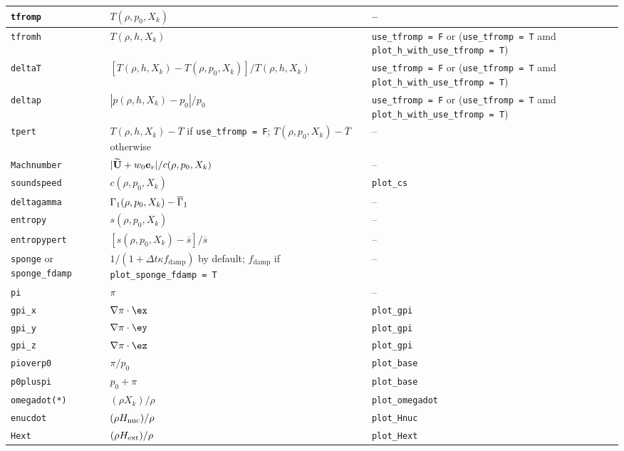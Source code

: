 \begin{center}
\begin{longtable}{|l|p{2.25in}|p{2.5in}|}
\hline
{\tt tfromp}              & $T(\rho, p_0, X_k)$  & -- \\
\hline
{\tt tfromh}            & $T(\rho, h, X_k)$    & {\tt use\_tfromp = F} or ({\tt use\_tfromp = T} amd {\tt plot\_h\_with\_use\_tfromp = T}) \\           
\hline
{\tt deltaT}            & $[T(\rho, h, X_k) - T(\rho, p_0, X_k)]/T(\rho, h, X_k)$  & {\tt use\_tfromp = F} or ({\tt use\_tfromp = T} amd {\tt plot\_h\_with\_use\_tfromp = T}) \\           
\hline
{\tt deltap}            & $|p(\rho,h,X_k) - p_0|/p_0$ & {\tt use\_tfromp = F} or ({\tt use\_tfromp = T} amd {\tt plot\_h\_with\_use\_tfromp = T}) \\           
\hline
{\tt tpert}               & $T(\rho,h,X_k) - \overline{T}$ if {\tt use\_tfromp = F}; $T(\rho,p_0,X_k) - \overline{T}$ otherwise & -- \\
\hline
{\tt Machnumber}          & $| \widetilde{{\bf U}} + w_0 \mathbf{e}_r | / c(\rho,p_0,X_k)$ & -- \\
\hline
{\tt soundspeed}        & $c(\rho,p_0,X_k)$ & {\tt plot\_cs} \\
\hline
{\tt deltagamma}          & $\Gamma_1(\rho,p_0,X_k) - \overline{\Gamma}_1$ & -- \\
\hline
{\tt entropy}             & $s(\rho,p_0,X_k)$ & -- \\
\hline
{\tt entropypert}         & $[s(\rho,p_0,X_k) - \overline{s}]/\overline{s}$ & -- \\
\hline
{\tt sponge} or {\tt sponge\_fdamp} & $1/(1 + \Delta t \kappa f_\mathrm{damp})$ by default; $f_\mathrm{damp}$ if {\tt plot\_sponge\_fdamp = T} & -- \\
\hline
{\tt pi}                 & $\pi$ & -- \\
\hline
{\tt gpi\_x}           & $\nabla \pi \cdot \ex$ & {\tt plot\_gpi} \\
\hline 
{\tt gpi\_y}           & $\nabla \pi \cdot \ey$ & {\tt plot\_gpi} \\
\hline
{\tt gpi\_z}           & $\nabla \pi \cdot \ez$ & {\tt plot\_gpi} \\
\hline
{\tt pioverp0}         & $\pi / p_0$ & {\tt plot\_base} \\
\hline
{\tt p0pluspi}         & $p_0 + \pi$ & {\tt plot\_base} \\
\hline
{\tt omegadot(*)}      & $(\rho X_k)/\rho$ & {\tt plot\_omegadot} \\
\hline
{\tt enucdot}          & $(\rho {H_{\rm nuc}})/\rho$ & {\tt plot\_Hnuc} \\
\hline
{\tt Hext}             & $(\rho {H_{\rm ext}})/\rho$ & {\tt plot\_Hext} \\

\end{longtable}
\end{center}
